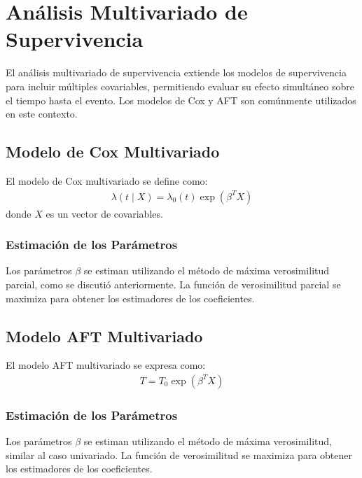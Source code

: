 \documentclass[a4paper]{report} %
\begin{document}
\chapter{An\'alisis Multivariado de Supervivencia}

El an\'alisis multivariado de supervivencia extiende los modelos de supervivencia para incluir m\'ultiples covariables, permitiendo evaluar su efecto simult\'aneo sobre el tiempo hasta el evento. Los modelos de Cox y AFT son com\'unmente utilizados en este contexto.

\section*{Modelo de Cox Multivariado}
El modelo de Cox multivariado se define como:
\begin{eqnarray*}
\lambda(t \mid X) = \lambda_0(t) \exp(\beta^T X)
\end{eqnarray*}
donde $X$ es un vector de covariables.

\subsection*{Estimaci\'on de los Par\'ametros}
Los par\'ametros $\beta$ se estiman utilizando el m\'etodo de m\'axima verosimilitud parcial, como se discuti\'o anteriormente. La funci\'on de verosimilitud parcial se maximiza para obtener los estimadores de los coeficientes.

\section*{Modelo AFT Multivariado}
El modelo AFT multivariado se expresa como:
\begin{eqnarray*}
T = T_0 \exp(\beta^T X)
\end{eqnarray*}

\subsection*{Estimaci\'on de los Par\'ametros}
Los par\'ametros $\beta$ se estiman utilizando el m\'etodo de m\'axima verosimilitud, similar al caso univariado. La funci\'on de verosimilitud se maximiza para obtener los estimadores de los coeficientes.
\end{document}
